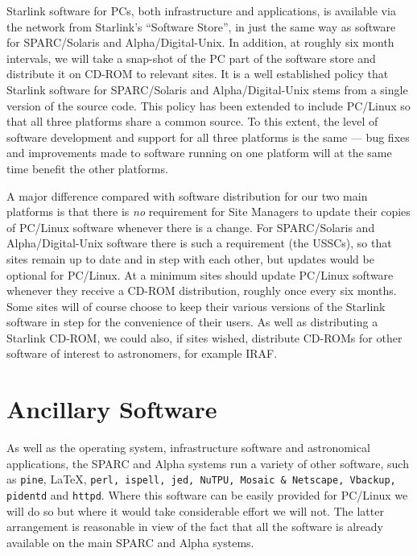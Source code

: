 Starlink software for PCs, both infrastructure and
applications, is available via the
network from Starlink's ``Software Store'', in just the same way as
software for SPARC/Solaris and Alpha/Digital-Unix.   In addition, at
roughly six month intervals, we will take a snap-shot of the PC
part of the software store and distribute it on CD-ROM to relevant
sites.  It is a well established policy that Starlink software for
SPARC/Solaris and Alpha/Digital-Unix stems from a single version of the
source code.  This policy has been extended to include
PC/Linux so that all three platforms share a common source.   To
this extent, the level of software development and support for all
three platforms is the same --- bug fixes and improvements made
to software running on one platform will at the same time benefit the
other platforms.

A major difference compared with software distribution for our two main
platforms is that there is {\em no} requirement for Site Managers to
update their copies of PC/Linux software whenever there is a change.
For SPARC/Solaris and Alpha/Digital-Unix software there is such a
requirement (the USSCs), so that sites remain up to date and in step
with each other,  but updates would be optional for PC/Linux.  
At a minimum sites should update PC/Linux software
whenever they receive a CD-ROM distribution, roughly once every six
months. Some sites will of course choose to keep their various versions of
the Starlink software in step for the convenience of their users.
As well as distributing a Starlink CD-ROM, we could also, if
sites wished, distribute CD-ROMs for other software of interest to
astronomers, for example IRAF.


\section{Ancillary Software}

As well as the operating system, infrastructure software and
astronomical applications, the SPARC and Alpha systems run a variety of
other software, such as {\tt pine}, \LaTeX, {\tt perl, ispell, jed,
NuTPU, Mosaic \& Netscape, Vbackup, pidentd} and {\tt httpd}.   
Where this software can be easily provided for PC/Linux
we will do so but where it would take considerable effort we will
not.  The latter arrangement is reasonable in view of the fact that all
the software is already available on the main SPARC and Alpha systems.


